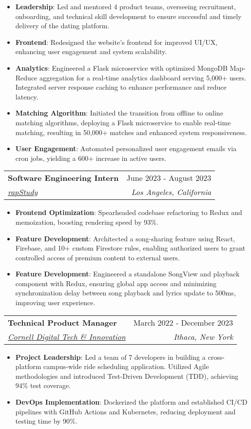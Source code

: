 \documentclass[letterpaper,10pt]{article}
\makeatletter
\newcommand{\resumeItem}[1]{
  \item\small{
    {#1 \vspace{-2pt}}
  }
}
\newcommand{\resumeSubheading}[4]{
  \vspace{-3pt}\item
    \begin{tabular*}{0.97\textwidth}[t]{@{}l@{\extracolsep{\fill}}r@{}}
      \textbf{#1} & #2 \\
      \textit{\small#3} & \textit{\small #4} \\
    \end{tabular*}\vspace{-6pt}
}
\newcommand{\resumeItemListStart}{\begin{itemize}}
\newcommand{\resumeItemListEnd}{\end{itemize}\vspace{-1.5pt}}
\makeatother
\begin{document}
\resumeItemListStart
\resumeItem{\textbf{Leadership}: Led and mentored 4 product teams, overseeing recruitment, onboarding, and technical skill development to ensure successful and timely delivery of the dating platform.}
\resumeItem{\textbf{Frontend}: Redesigned the website's frontend for improved UI/UX, enhancing user engagement and system scalability.}
\resumeItem{\textbf{Analytics}: Engineered a Flask microservice with optimized MongoDB Map-Reduce aggregation for a real-time analytics dashboard serving 5,000+ users. Integrated server response caching to enhance performance and reduce latency.}
\resumeItem{\textbf{Matching Algorithm}: Initiated the transition from offline to online matching algorithms, deploying a Flask microservice to enable real-time matching, resulting in 50,000+ matches and enhanced system responsiveness.}
\resumeItem{\textbf{User Engagement}: Automated personalized user engagement emails via cron jobs, yielding a 600+ increase in active users.}
\resumeItemListEnd
\vspace{-12pt}

\resumeSubheading{Software Engineering Intern}{June 2023 - August 2023}{\href{https://rapstudy.com/}{rapStudy}}{Los Angeles, California}
\resumeItemListStart
\resumeItem{\textbf{Frontend Optimization}: Spearheaded codebase refactoring to Redux and memoization, boosting rendering speed by 93\%.}
\resumeItem{\textbf{Feature Development}: Architected a song-sharing feature using React, Firebase, and 10+ custom Firestore rules, enabling authorized users to grant controlled access of premium content to external users.}
\resumeItem{\textbf{Feature Development}: Engineered a standalone SongView and playback component with Redux, ensuring global app access and minimizing synchronization delay between song playback and lyrics update to 500ms, improving user experience.}
\resumeItemListEnd

\resumeSubheading
{Technical Product Manager}{March 2022 - December 2023}
{\href{https://www.cornelldti.org/}{Cornell Digital Tech \& Innovation}}{Ithaca, New York}
\resumeItemListStart
\resumeItem{\textbf{Project Leadership}: Led a team of 7 developers in building a cross-platform campus-wide ride scheduling application. Utilized Agile methodologies and introduced Test-Driven Development (TDD), achieving 94\% test coverage.}
\resumeItem{\textbf{DevOps Implementation}: Dockerized the platform and established CI/CD pipelines with GitHub Actions and Kubernetes, reducing deployment and testing time by 90\%.}
\resumeItemListEnd
\end{document}
